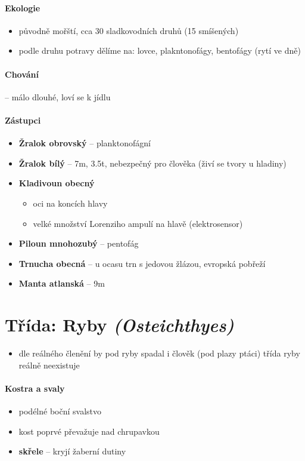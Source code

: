 \paragraph{Ekologie}
\begin{itemize}
\item původně mořští, cca 30 sladkovodních druhů (15 smíšených)
\item podle druhu potravy dělíme na: lovce, plakntonofágy, bentofágy (rytí ve dně)
\end{itemize}

\paragraph{Chování} -- málo dlouhé, loví se k jídlu

\paragraph{Zástupci}
\begin{itemize}
\item \textbf{Žralok obrovský} -- planktonofágní
\item \textbf{Žralok bílý} -- 7m, 3.5t, nebezpečný pro člověka (živí se tvory u hladiny)
\item \textbf{Kladivoun obecný}
	\begin{itemize}
	\item oci na koncích hlavy
	\item velké množství Lorenziho ampulí na hlavě (elektrosensor)
	\end{itemize}
\item \textbf{Piloun mnohozubý} -- pentofág
\item \textbf{Trnucha obecná} -- u ocasu trn s jedovou žlázou, evropská pobřeží
\item \textbf{Manta atlanská} -- 9m 
\end{itemize}




\section{Třída: Ryby \textit{(Osteichthyes)}}
\begin{itemize}
\item dle reálného členění by pod ryby spadal i člověk (pod plazy ptáci) \ra třída ryby reálně neexistuje
\end{itemize}

\paragraph{Kostra a svaly}
\begin{itemize}
\item podélné boční svalstvo
\item kost poprvé převažuje nad chrupavkou
\item \textbf{skřele} -- kryjí žaberní dutiny
\end{itemize}

